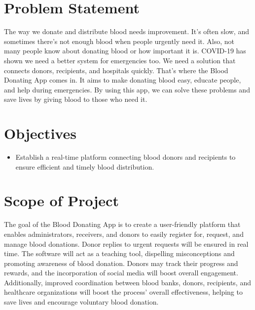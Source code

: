 \section{Problem Statement}
The way we donate and distribute blood needs improvement. It's often slow, and sometimes there's not enough blood when people urgently need it. Also, not many people know about donating blood or how important it is. COVID-19 has shown we need a better system for emergencies too. We need a solution that connects donors, recipients, and hospitals quickly. That's where the Blood Donating App comes in. It aims to make donating blood easy, educate people, and help during emergencies. By using this app, we can solve these problems and save lives by giving blood to those who need it. 

\section{Objectives}

 \begin{itemize}

    \item Establish a real-time platform connecting blood donors and recipients to ensure efficient and timely blood distribution.
   
\end{itemize}



\section{Scope of Project}

The goal of the Blood Donating App is to create a user-friendly platform that enables administrators, receivers, and donors to easily register for, request, and manage blood donations. Donor replies to urgent requests will be ensured in real time. The software will act as a teaching tool, dispelling misconceptions and promoting awareness of blood donation. Donors may track their progress and rewards, and the incorporation of social media will boost overall engagement. Additionally, improved coordination between blood banks, donors, recipients, and healthcare organizations will boost the process' overall effectiveness, helping to save lives and encourage voluntary blood donation.


